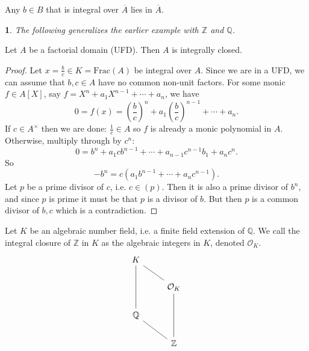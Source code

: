 \documentclass[12pt]{article}
\newtheorem{para}[theorem]{}
\begin{document}
\begin{corollary}
	Any $b\in B$ that is integral over $\overline{A}$ lies in $\overline{A}$.
\end{corollary}

\begin{para}
	The following generalizes the earlier example with $\mathbb{Z}$ and $\mathbb{Q}$.
\end{para}
\begin{proposition}
	Let $A$ be a factorial domain (UFD). Then $A$ is integrally closed.
\end{proposition}
\begin{proof}
	 Let $x=\frac{b}{c}\in K=\text{Frac}(A)$ be integral over $A$. Since we are in a UFD, we can assume that $b,c\in A$ have no common non-unit factors. For some monic $f\in A[X]$, say $f=X^n+a_1X^{n-1}+\cdots+a_n$, we have 
	 \begin{equation*}
		 0= f(x) = \left(\frac{b}{c}\right)^n + a_1\left(\frac{b}{c}\right)^{n-1} + \cdots + a_n.
	 \end{equation*}
	 If $c\in A^\times$ then we are done: $\frac{1}{c}\in A$ so $f$ is already a monic polynomial in $A$. Otherwise, multiply through by $c^n$:
	 \begin{equation*}
		 0 = b^n + a_1cb^{n-1} + \cdots + a_{n-1}c^{n-1}b_1+a_nc^n.
	 \end{equation*}
	 So 
	 \begin{equation*}
		 -b^n = c(a_1b^{n-1}+\cdots + a_nc^{n-1}).
	 \end{equation*}
	 Let $p$ be a prime divisor of $c$, i.e. $c\in (p)$. Then it is also a prime divisor of $b^n$, and since $p$ is prime it must be that $p$ is a divisor of $b$. But then $p$ is a common divisor of $b,c$ which is a contradiction. 
\end{proof}

\begin{example}
	Let $K$ be an algebraic number field, i.e. a finite field extension of $\mathbb{Q}$. We call the integral closure of $\mathbb{Z}$ in $K$ as the algebraic integers in $K$, denoted $\mathcal{O}_K$.
	\begin{equation*}
\begin{tikzcd}
K                              &                                                    \\
                               & \mathcal{O}_K \arrow[lu, no head]                  \\
\mathbb{Q} \arrow[uu, no head] &                                                    \\
                               & \mathbb{Z} \arrow[uu, no head] \arrow[lu, no head]
\end{tikzcd}
	\end{equation*}
\end{example}
\end{document}
